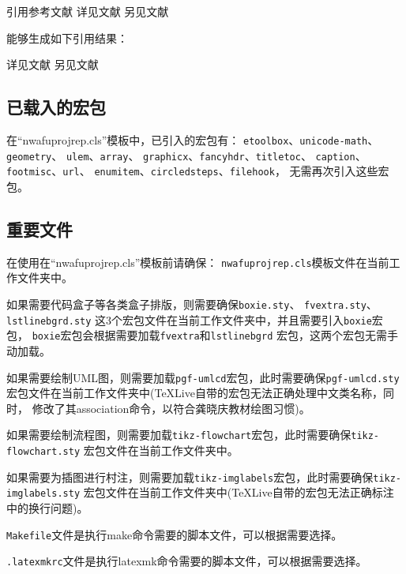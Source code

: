 \documentclass[
  ]{nwafuprojrep}
\begin{document}
\begin{center}
  \begin{langCVOne}[tex][texcode06][\LaTeX{}]{引用参考文献}
    详见文献\cite{Peebles2001-100-100}\parencite{Babu2014--}
    另见文献\cite[49]{于潇2012-1518-1523}\parencite[106]{Babu2014--}
  \end{langCVOne}
\end{center}

能够生成如下引用结果：

详见文献\cite{Peebles2001-100-100}\parencite{Babu2014--}
另见文献\cite[49]{于潇2012-1518-1523}\parencite[106]{Babu2014--}

\subsection{已载入的宏包}
在\enquote{nwafuprojrep.cls}模板中，已引入的宏包有：
\verb|etoolbox|、\verb|unicode-math|、\verb|geometry|、
\verb|ulem|、\verb|array|、
\verb|graphicx|、\verb|fancyhdr|、\verb|titletoc|、
\verb|caption|、\verb|footmisc|、\verb|url|、
\verb|enumitem|、\verb|circledsteps|、\verb|filehook|，
无需再次引入这些宏包。

\subsection{重要文件}
\begin{importantBox}
  在使用在\enquote{nwafuprojrep.cls}模板前请确保：
  \verb|nwafuprojrep.cls|模板文件在当前工作文件夹中。
  
  如果需要代码盒子等各类盒子排版，则需要确保\verb|boxie.sty|、
  \verb|fvextra.sty|、\verb|lstlinebgrd.sty|
  这3个宏包文件在当前工作文件夹中，并且需要引入\verb|boxie|宏包，
  \verb|boxie|宏包会根据需要加载\verb|fvextra|和\verb|lstlinebgrd|
  宏包，这两个宏包无需手动加载。
  
  如果需要绘制UML图，则需要加载\verb|pgf-umlcd|宏包，此时需要确保\verb|pgf-umlcd.sty|
  宏包文件在当前工作文件夹中(TeXLive自带的宏包无法正确处理中文类名称，同时，
  修改了其association命令，以符合龚晓庆教材绘图习惯)。
  
  如果需要绘制流程图，则需要加载\verb|tikz-flowchart|宏包，此时需要确保\verb|tikz-flowchart.sty|
  宏包文件在当前工作文件夹中。
  
  如果需要为插图进行村注，则需要加载\verb|tikz-imglabels|宏包，此时需要确保\verb|tikz-imglabels.sty|
  宏包文件在当前工作文件夹中(TeXLive自带的宏包无法正确标注中的换行问题)。

  \verb|Makefile|文件是执行make命令需要的脚本文件，可以根据需要选择。

  \verb|.latexmkrc|文件是执行latexmk命令需要的脚本文件，可以根据需要选择。
\end{importantBox}
\end{document}
